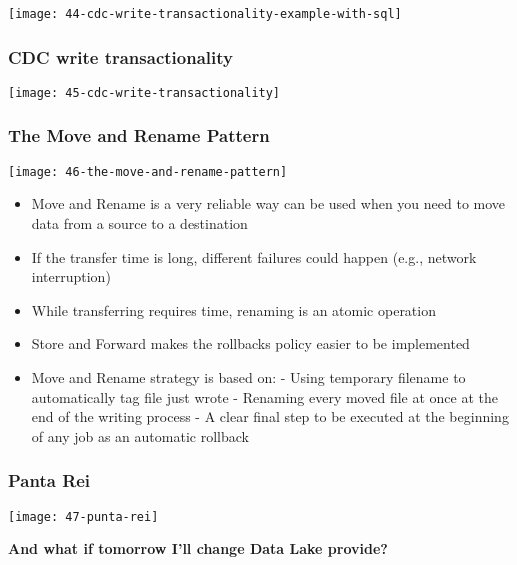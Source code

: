 \begin{center}
\texttt{[image: 44-cdc-write-transactionality-example-with-sql]}
\end{center}

\subsubsection{CDC write transactionality}

\begin{center}
\texttt{[image: 45-cdc-write-transactionality]}
\end{center}

\subsubsection{The Move and Rename Pattern}

\begin{center}
\texttt{[image: 46-the-move-and-rename-pattern]}
\end{center}

\begin{itemize}
	\item Move and Rename is a very reliable way can be used when you need to move data from a source to a destination
	\item If the transfer time is long, different failures could happen (e.g., network interruption)
	\item While transferring requires time, renaming is an atomic operation
	\item Store and Forward makes the rollbacks policy easier to be implemented
	\item Move and Rename strategy is based on:
		- Using temporary filename to automatically tag file just wrote
		- Renaming every moved file at once at the end of the writing process
		- A clear final step to be executed at the beginning of any job as an automatic rollback 
\end{itemize}

\subsubsection{Panta Rei}

\begin{center}
\texttt{[image: 47-punta-rei]}
\end{center}

\textbf{And what if tomorrow I’ll change Data Lake provide?}

